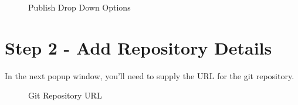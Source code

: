 \documentclass[
  letterpaper,
  DIV=11,
  numbers=noendperiod]{scrreprt}
\begin{document}
\begin{figure}


\caption{\label{fig-publish-dropdown}Publish Drop Down Options}

\end{figure}%

\section{Step 2 - Add Repository
Details}\label{step-2---add-repository-details}

In the next popup window, you'll need to supply the URL for the git
repository.

\begin{figure}


\caption{\label{fig-repo-url}Git Repository URL}

\end{figure}%
\end{document}
